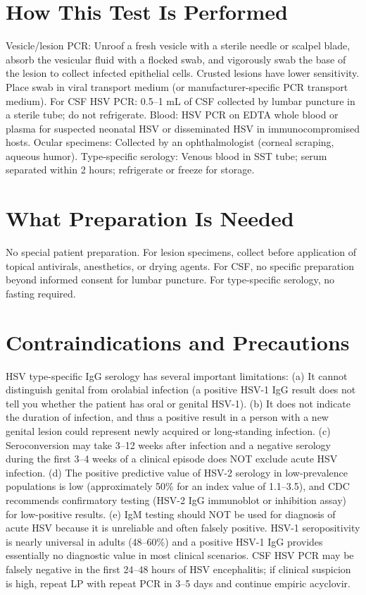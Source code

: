 \section*{How This Test Is Performed}
Vesicle/lesion PCR: Unroof a fresh vesicle with a sterile needle or scalpel blade, absorb the vesicular fluid with a flocked swab, and vigorously swab the base of the lesion to collect infected epithelial cells. Crusted lesions have lower sensitivity. Place swab in viral transport medium (or manufacturer-specific PCR transport medium). For CSF HSV PCR: 0.5--1 mL of CSF collected by lumbar puncture in a sterile tube; do not refrigerate. Blood: HSV PCR on EDTA whole blood or plasma for suspected neonatal HSV or disseminated HSV in immunocompromised hosts. Ocular specimens: Collected by an ophthalmologist (corneal scraping, aqueous humor). Type-specific serology: Venous blood in SST tube; serum separated within 2 hours; refrigerate or freeze for storage.

\section*{What Preparation Is Needed}
No special patient preparation. For lesion specimens, collect before application of topical antivirals, anesthetics, or drying agents. For CSF, no specific preparation beyond informed consent for lumbar puncture. For type-specific serology, no fasting required.

\section*{Contraindications and Precautions}
HSV type-specific IgG serology has several important limitations: (a) It cannot distinguish genital from orolabial infection (a positive HSV-1 IgG result does not tell you whether the patient has oral or genital HSV-1). (b) It does not indicate the duration of infection, and thus a positive result in a person with a new genital lesion could represent newly acquired or long-standing infection. (c) Seroconversion may take 3--12 weeks after infection and a negative serology during the first 3--4 weeks of a clinical episode does NOT exclude acute HSV infection. (d) The positive predictive value of HSV-2 serology in low-prevalence populations is low (approximately 50\% for an index value of 1.1--3.5), and CDC recommends confirmatory testing (HSV-2 IgG immunoblot or inhibition assay) for low-positive results. (e) IgM testing should NOT be used for diagnosis of acute HSV because it is unreliable and often falsely positive. HSV-1 seropositivity is nearly universal in adults (48--60\%) and a positive HSV-1 IgG provides essentially no diagnostic value in most clinical scenarios. CSF HSV PCR may be falsely negative in the first 24--48 hours of HSV encephalitis; if clinical suspicion is high, repeat LP with repeat PCR in 3--5 days and continue empiric acyclovir.

